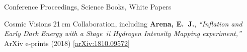 \documentclass{resume} %
\begin{document}
\begin{rSection}{Conference Proceedings, Science Books, White Papers}
\begin{etaremune}
\item {Cosmic Visions 21$\,$cm Collaboration}, including \textbf{{Arena}, E.~J.},
\textit{``Inflation and Early Dark Energy with a {Stage~{\sc ii}} Hydrogen Intensity Mapping experiment,''} ArXiv e-prints (2018) \href{https://arxiv.org/abs/1810.09572}{[arXiv:1810.09572]}

\end{etaremune}

\end{rSection}

\end{document}

